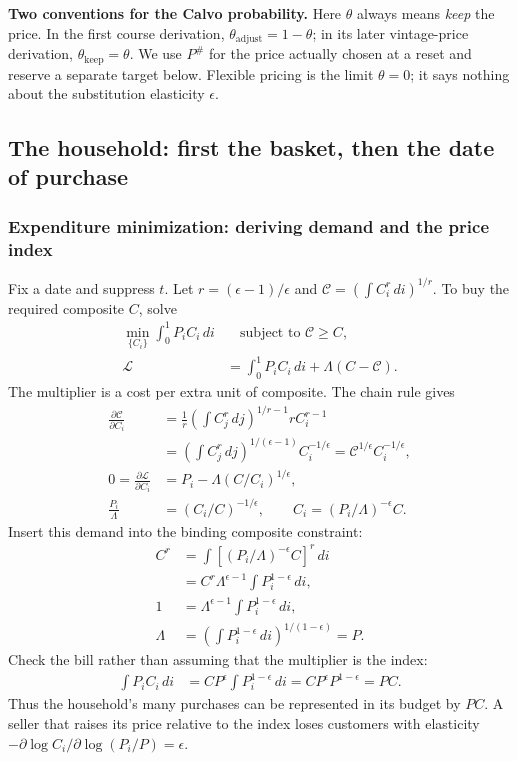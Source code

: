 \begin{blueblock}
\textbf{Two conventions for the Calvo probability.}
Here $\theta$ always means \emph{keep} the price. In the first course derivation,
$\theta_{\mathrm{adjust}}=1-\theta$; in its later vintage-price derivation,
$\theta_{\mathrm{keep}}=\theta$. We use $P^{\#}$ for the price actually chosen
at a reset and reserve a separate target below. Flexible pricing is the limit
$\theta=0$; it says nothing about the substitution elasticity $\epsilon$.
\end{blueblock}

\subsection{The household: first the basket, then the date of purchase}

\subsubsection{Expenditure minimization: deriving demand and the price index}

Fix a date and suppress $t$. Let $r=(\epsilon-1)/\epsilon$ and
$\mathcal C=(\int C_i^r\,di)^{1/r}$. To buy the required composite $C$, solve
\begin{align}
 \min_{\{C_i\}}\int_0^1P_iC_i\,di
 &\quad\text{subject to }\mathcal C\geq C,\\
 \mathcal L&=\int_0^1P_iC_i\,di+\Lambda(C-\mathcal C).
\end{align}
The multiplier is a cost per extra unit of composite. The chain rule gives
\begin{align}
 \frac{\partial\mathcal C}{\partial C_i}
 &=\frac1r\left(\int C_j^r\,dj\right)^{1/r-1}r C_i^{r-1}\\
 &=\left(\int C_j^r\,dj\right)^{1/(\epsilon-1)} C_i^{-1/\epsilon}
 =\mathcal C^{1/\epsilon}C_i^{-1/\epsilon},\\
 0=\frac{\partial\mathcal L}{\partial C_i}
 &=P_i-\Lambda(C/C_i)^{1/\epsilon},\\
 \frac{P_i}{\Lambda}&=(C_i/C)^{-1/\epsilon},\qquad
 C_i=(P_i/\Lambda)^{-\epsilon}C.
\end{align}
Insert this demand into the binding composite constraint:
\begin{align}
 C^r&=\int[(P_i/\Lambda)^{-\epsilon}C]^r\,di\\
 &=C^r\Lambda^{\epsilon-1}\int P_i^{1-\epsilon}\,di,\\
 1&=\Lambda^{\epsilon-1}\int P_i^{1-\epsilon}\,di,\\
 \Lambda&=\left(\int P_i^{1-\epsilon}\,di\right)^{1/(1-\epsilon)}=P.
\end{align}
Check the bill rather than assuming that the multiplier is the index:
\begin{align}
 \int P_iC_i\,di
 &=CP^\epsilon\int P_i^{1-\epsilon}\,di
 =CP^\epsilon P^{1-\epsilon}=PC.\label{eq:nk-ces-bill}
\end{align}
Thus the household's many purchases can be represented in its budget by $PC$.
A seller that raises its price relative to the index loses customers with
elasticity $-\partial\log C_i/\partial\log(P_i/P)=\epsilon$.

